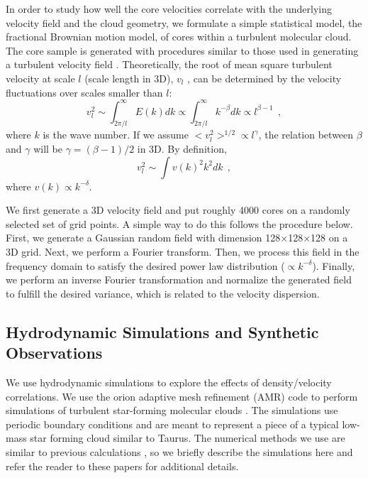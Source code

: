 \documentclass[iop,revtex4]{emulateapj}
\def\lc{\>\> ,}
\begin{document}
In order to study how well the core velocities correlate with the underlying velocity field and the cloud geometry, we formulate a simple statistical model, the fractional Brownian motion model, of cores within a turbulent molecular cloud. The core sample is generated with procedures similar to those used in generating a turbulent velocity field \citep{Turbulence_Brunt2002,Falgarone2003}. Theoretically, the root of mean square turbulent velocity at scale $l$ (scale length in 3D), $v_l$ , can be determined by the velocity fluctuations over scales smaller than $l$:
\begin{equation}
v_l^2\sim \int^{\infty}_{2\pi/l}E(k)dk\propto \int^{\infty}_{2\pi/l} k^{-\beta}dk\propto l^{\beta-1}\lc
\label{equ:energy_spec}
\end{equation}
where $k$ is the wave number.
If we assume $<v_l^2>^{1/2}\propto l^{\gamma}$, the relation between $\beta$ and $\gamma$ will be $\gamma=(\beta-1)/2$ in 3D. By definition,
\begin{equation}
v_l^2\sim \int v(k)^2 k^2dk \lc
\end{equation}
where $v(k)\propto k^{-\delta}$.


We first generate a 3D velocity field and put roughly 4000 cores on a randomly selected set of grid points. A simple way to do this follows the procedure below. First, we generate a Gaussian random field with dimension 128$\times$128$\times$128 on a 3D grid. Next, we perform a Fourier transform. Then, we process this field in the frequency domain to satisfy the desired power law distribution ($\propto k^{-\delta}$). Finally, we perform an inverse Fourier transformation and normalize the generated field to fulfill the desired variance, which is related to the velocity dispersion.


\subsection{Hydrodynamic Simulations and Synthetic Observations}
\label{subsec:simulation}

 We use hydrodynamic simulations to explore the effects of density/velocity correlations.
We use the {\sc orion} adaptive mesh refinement (AMR) code to perform simulations of turbulent star-forming molecular clouds \citep{truelove98,klein99}.  The simulations use periodic boundary conditions and are meant to represent a piece of a typical low-mass star forming cloud similar to Taurus. The numerical methods we use are similar to previous calculations \citep[e.g.][]{Offner09, Offner13}, so we briefly describe the simulations here and refer the reader to these papers for additional details.
\end{document}
